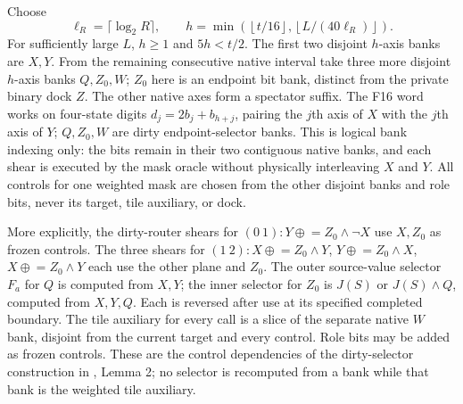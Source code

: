 Choose
\[
 \ell_R=\lceil\log_2 R\rceil,\qquad
 h=\min\!\left(\left\lfloor t/16\right\rfloor,
                 \left\lfloor L/(40\ell_R)\right\rfloor\right).
\]
For sufficiently large $L$, $h\ge1$ and $5h<t/2$.  The first two
disjoint $h$-axis banks are $X,Y$.  From the remaining consecutive native
interval take three more disjoint $h$-axis banks $Q,Z_0,W$; $Z_0$ here is
an endpoint bit bank, distinct from the private binary dock $Z$.  The
other native axes form a spectator suffix.  The F16 word works on
four-state digits $d_j=2b_j+b_{h+j}$, pairing the $j$th axis of $X$
with the $j$th axis of $Y$; $Q,Z_0,W$
are dirty endpoint-selector banks.  This is logical bank indexing only:
the bits remain in their two contiguous native banks, and each shear is
executed by the mask oracle without physically interleaving $X$ and $Y$.
All controls for one weighted mask
are chosen from the other disjoint banks and role bits, never its target,
tile auxiliary, or dock.

More explicitly, the dirty-router shears for
$(0\ 1):Y\mathrel{\oplus}=Z_0\wedge\neg X$ use $X,Z_0$ as frozen
controls.  The three shears for
$(1\ 2):X\mathrel{\oplus}=Z_0\wedge Y$,
$Y\mathrel{\oplus}=Z_0\wedge X$,
$X\mathrel{\oplus}=Z_0\wedge Y$ each use the other plane and $Z_0$.
The outer source-value selector $F_a$ for $Q$ is computed from $X,Y$;
the inner selector for $Z_0$ is $J(S)$ or $J(S)\wedge Q$, computed
from $X,Y,Q$. Each is reversed after use at its specified completed
boundary.
The tile auxiliary for every call is a slice of the separate native $W$
bank, disjoint from the current target and every control.  Role bits may
be added as frozen controls.  These are the control dependencies of the
dirty-selector construction in
, Lemma 2; no selector is recomputed
from a bank while that bank is the weighted tile auxiliary.

